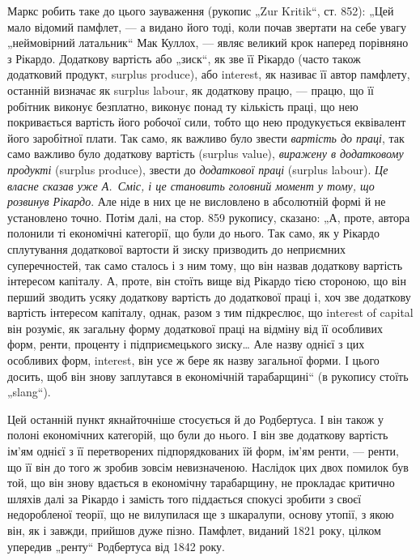 Маркс робить таке до цього зауваження (рукопис „Zur Kritik“,
ст. 852): „Цей мало відомий памфлет, — а видано його тоді, коли почав
звертати на себе увагу „неймовірний латальник“ Мак Куллох, — являє
великий крок наперед порівняно з Рікардо. Додаткову вартість або
„зиск“, як зве її Рікардо (часто також додатковий продукт, surplus
produce), або interest, як називає її автор памфлету, останній визначає як
surplus labour, як додаткову працю, — працю, що її робітник виконує безплатно,
виконує понад ту кількість праці, що нею покривається вартість
його робочої сили, тобто що нею продукується еквівалент його заробітної
плати. Так само, як важливо було звести  \emph{вартість до праці}, так
само важливо було додаткову вартість (surplus value), \emph{виражену в додатковому
продукті} (surplus produce), звести до \emph{додаткової праці}
(surplus labour). \emph{Це власне сказав уже А.~Сміс, і це становить головний
момент у тому, що розвинув Рікардо}. Але ніде в них це не
висловлено в абсолютній формі й не установлено точно. Потім далі, на
стор. 859 рукопису, сказано: „А, проте, автора полонили ті економічні
категорії, що були до нього. Так само, як у Рікардо сплутування додаткової
вартости й зиску призводить до неприємних суперечностей, так
само сталось і з ним тому, що він назвав додаткову вартість
інтересом капіталу. А, проте, він стоїть вище від Рікардо тією стороною, що
він перший зводить усяку додаткову вартість до додаткової праці і, хоч зве
додаткову вартість інтересом капіталу, однак, разом з тим підкреслює,
що interest of capital він розуміє, як загальну форму
додаткової праці на відміну від її особливих форм, ренти, проценту і
підприємецького зиску\dots{} Але назву однієї з цих особливих форм, interest,
він усе ж бере як назву загальної форми. І цього досить, щоб він знову
заплутався в економічній тарабарщині“ (в рукопису стоїть „slang“).

Цей останній пункт якнайточніше стосується й до Родбертуса. І він
також у полоні економічних категорій, що були до нього. І він зве
додаткову вартість ім’ям однієї з її перетворених підпорядкованих їй форм,
ім’ям ренти, — ренти, що її він до того ж зробив зовсім невизначеною.
Наслідок цих двох помилок був той, що він знову вдається в економічну
тарабарщину, не прокладає критично шляхів далі за Рікардо і замість
того піддається спокусі зробити з своєї недоробленої теорії, що не
вилупилася ще з шкаралупи, основу утопії, з якою він, як і завжди,
прийшов дуже пізно. Памфлет, виданий 1821 року, цілком упередив
„ренту“ Родбертуса від 1842 року.

